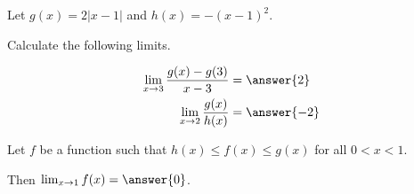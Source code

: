 \documentclass{ximera}
\author{Nela Lakos \and Kyle Parsons}
\begin{document}
\begin{exercise}

Let $g(x) = 2\left|x-1\right|$ and $h(x) = -(x-1)^2$.

Calculate the following limits.

\begin{align*}
\lim_{x\to3}\frac{g(x)-g(3)}{x-3} &= \answer{2}\\
\lim_{x\to2}\frac{g(x)}{h(x)} &= \answer{-2}
\end{align*}

Let $f$ be a function such that $h(x) \leq f(x) \leq g(x)$ for all $0 < x < 1$.

Then $\lim_{x\to1}f(x) = \answer{0}$.

\end{exercise}
\end{document}
